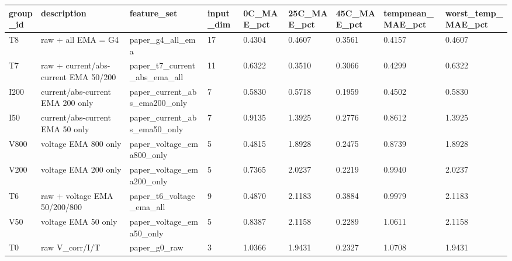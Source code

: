 \begin{tabular}{lllllllll}
\hline
group_id & description & feature_set & input_dim & 0C_MAE_pct & 25C_MAE_pct & 45C_MAE_pct & tempmean_MAE_pct & worst_temp_MAE_pct \\
\hline
T8 & raw + all EMA = G4 & paper_g4_all_ema & 17 & 0.4304 & 0.4607 & 0.3561 & 0.4157 & 0.4607 \\
T7 & raw + current/abs-current EMA 50/200 & paper_t7_current_abs_ema_all & 11 & 0.6322 & 0.3510 & 0.3066 & 0.4299 & 0.6322 \\
I200 & current/abs-current EMA 200 only & paper_current_abs_ema200_only & 7 & 0.5830 & 0.5718 & 0.1959 & 0.4502 & 0.5830 \\
I50 & current/abs-current EMA 50 only & paper_current_abs_ema50_only & 7 & 0.9135 & 1.3925 & 0.2776 & 0.8612 & 1.3925 \\
V800 & voltage EMA 800 only & paper_voltage_ema800_only & 5 & 0.4815 & 1.8928 & 0.2475 & 0.8739 & 1.8928 \\
V200 & voltage EMA 200 only & paper_voltage_ema200_only & 5 & 0.7365 & 2.0237 & 0.2219 & 0.9940 & 2.0237 \\
T6 & raw + voltage EMA 50/200/800 & paper_t6_voltage_ema_all & 9 & 0.4870 & 2.1183 & 0.3884 & 0.9979 & 2.1183 \\
V50 & voltage EMA 50 only & paper_voltage_ema50_only & 5 & 0.8387 & 2.1158 & 0.2289 & 1.0611 & 2.1158 \\
T0 & raw V_corr/I/T & paper_g0_raw & 3 & 1.0366 & 1.9431 & 0.2327 & 1.0708 & 1.9431 \\
\hline
\end{tabular}
